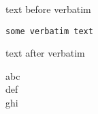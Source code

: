 \documentclass{standalone}
\begin{document}
\begin{minipage}{5cm}
text before verbatim
\begin{verbatim}
some verbatim text
\end{verbatim}
text after verbatim
\end{minipage}%
\begin{minipage}{5cm}
abc\\
def\\
ghi
\end{minipage}
\end{document}
